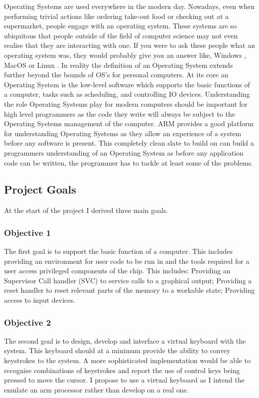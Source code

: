 Operating Systems are used everywhere in the modern day. Nowadays, even when performing trivial actions like ordering take-out food or checking out at a supermarket, people engage with an operating system. These systems are so ubiquitous that people outside of the field of computer science may not even realise that they are interacting with one. If you were  to ask these people what an operating system was, they would probably give you an answer like, Windows \cite{windows}, MacOS \cite{apple} or Linux \cite{linux}. In reality the definition of an Operating System extends further beyond the bounds of OS's for personal computers. At its core an Operating System is the low-level software which supports the basic functions of a computer, tasks such as scheduling, and controlling IO devices. Understanding the role Operating Systems play for modern computers should be important for high level programmers as the code they write will always be subject to the Operating Systems management of the computer. ARM provides a good platform for understanding Operating Systems as they allow an experience of a system before any software is present. This completely clean slate to build on can build a programmers understanding of an Operating System as before any application code can be written, the programmer has to tackle at least some of the problems. 

\subsection{Project Goals}
At the start of the project I derived three main goals.
\subsubsection{Objective 1}
The first goal is to support the basic function of a computer. This includes providing an environment for user code to be run in and the tools required for a user access privileged components of the chip. This includes: Providing an Supervisor Call handler (SVC) to service calls to a graphical output; Providing a reset handler to reset relevant parts of the memory to a workable state; Providing access to input devices. 
\subsubsection{Objective 2}
The second goal is to design, develop and interface a virtual keyboard with the system. This keyboard should at a minimum provide the ability to convey keystrokes to the system. A more sophisticated implementation would be able to recognise combinations of keystrokes and report the use of control keys being pressed to move the cursor. I propose to use a virtual keyboard as I intend the emulate an arm processor rather than develop on a real one. 

